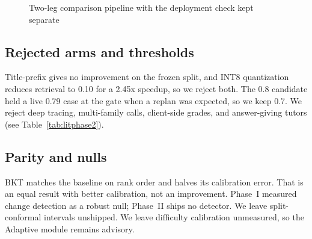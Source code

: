 \documentclass[sn-mathphys,Numbered]{sn-jnl}%
\theoremstyle{thmstyleone}%
\theoremstyle{thmstyletwo}%
\theoremstyle{thmstylethree}%
\begin{document}
\begin{figure}[htbp]%
\centering
{}
\caption{Two-leg comparison pipeline with the deployment check kept separate}\label{fig:comparison-pipeline}
\end{figure}

\subsection{Rejected arms and thresholds}\label{subsec46}

Title-prefix gives no improvement on the frozen split, and INT8 quantization reduces retrieval to 0.10 for a 2.45x speedup, so we reject both. The 0.8 candidate held a live 0.79 case at the gate when a replan was expected, so we keep 0.7. We reject deep tracing, multi-family calls, client-side grades, and answer-giving tutors (see Table~\ref{tab:litphase2}).

\subsection{Parity and nulls}\label{subsec47}

BKT matches the baseline on rank order and halves its calibration error. That is an equal result with better calibration, not an improvement. Phase~I measured change detection as a robust null; Phase~II ships no detector. We leave split-conformal intervals unshipped. We leave difficulty calibration unmeasured, so the Adaptive module remains advisory.
\end{document}
